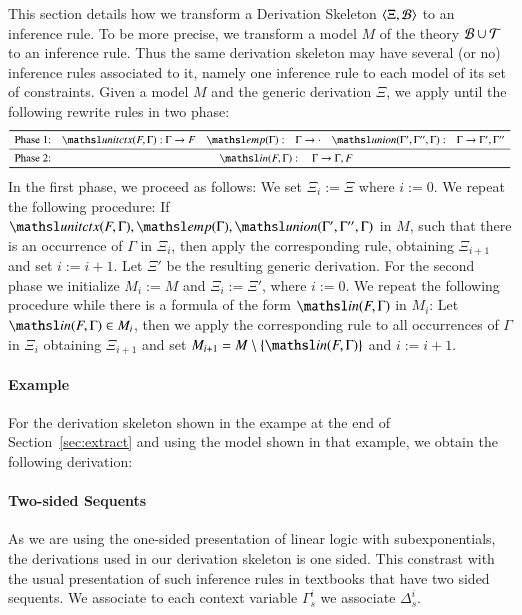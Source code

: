 \documentclass[a4paper,10pt]{article}
\newcommand\thSeq{\ensuremath{\Tscr}}
\newcommand{\elin}[2]{\ensuremath{{\tsl{unitctx}(\ensuremath{#1}, \ensuremath{#2})}}}
\newcommand{\emp}[1]{\ensuremath{{\tsl{emp}(\ensuremath{#1})}}}
\newcommand{\union}[3]{\ensuremath{{\tsl{union}(\ensuremath{#1},\ensuremath{#2},\ensuremath{ #3})}}}
\newcommand{\In}[2]{\ensuremath{\tsl{in}(\ensuremath{#1},\ensuremath{#2})}}
\begin{document}
This section details how we transform a Derivation Skeleton $\langle\Xi, {\cal B}\rangle$ to an 
inference rule. To be more precise, we transform a model $M$ of the theory $\Bscr \cup \thSeq$
to an inference rule. Thus the same derivation skeleton may have several (or no) inference rules associated 
to it, namely one inference rule to each model of its set of constraints. Given a model $M$ and the generic
derivation $\Xi$, we apply until the following rewrite rules in two phase:
\[
\begin{array}{l@{\quad}r@{~}l@{\quad}r@{\quad}l@{\quad}r@{\quad}l}
\toprule
{\textrm{Phase 1:}} 
& \elin{F}{\Gamma}:  & \Gamma \rightarrow F 
& \emp{\Gamma}: & \Gamma \rightarrow \cdot 
& \union{\Gamma'}{\Gamma''}{\Gamma}: & \Gamma \rightarrow \Gamma',
\Gamma''\\
\midrule
\textrm{Phase 2:} & \multicolumn{6}{c}{
\In{F}{\Gamma}: \quad \Gamma \rightarrow \Gamma, F
}\\
\bottomrule
\end{array}
\]
In the first phase, we proceed as follows: We set $\Xi_i := \Xi$ where $ i := 0$.
We repeat the following procedure: If 
$\elin{F}{\Gamma}, \emp{\Gamma}, \union{\Gamma'}{\Gamma''}{\Gamma}$ in $M$, such 
that there is an occurrence of $\Gamma$ in $\Xi_i$, then apply the corresponding 
rule, obtaining $\Xi_{i+1}$ and set $i := i + 1$. 
Let $\Xi'$ be the resulting generic derivation.
For the second phase we initialize $M_i := M$ and $\Xi_i := \Xi'$, where $i := 0$. We repeat 
the following procedure while there is a formula of the form $\In{F}{\Gamma}$ in $M_i$:
Let $\In{F}{\Gamma} \in M_i$, then we apply the corresponding rule to all occurrences of $\Gamma$ in $\Xi_i$
obtaining $\Xi_{i+1}$ and set $M_{i+1} = M \setminus \{\In{F}{\Gamma}\}$  and $i := i + 1$.

\paragraph{Example}
For the derivation skeleton shown in the exampe at the end of 
Section~\ref{sec:extract} and using the model shown in that example, we obtain the following derivation:




\paragraph{Two-sided Sequents}
As we are using the one-sided presentation of linear logic with subexponentials, the derivations used 
in our derivation skeleton is one sided. This constrast with the usual presentation of such inference
rules in textbooks that have two sided sequents. We associate to each context variable $\Gamma_s^i$ we 
associate $\Delta_s^i$.
\end{document}
